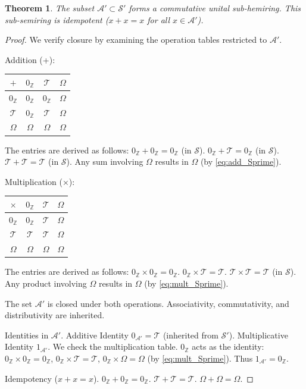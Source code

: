 \documentclass[11pt, a4paper]{article}
\theoremstyle{plain}
\newtheorem{theorem}{Theorem}[section]
\theoremstyle{definition}
\numberwithin{equation}{section}
\newcommand{\Z}{\mathbb{Z}}
\newcommand{\Tobj}{\mathcal{T}} %
\newcommand{\OmegaObj}{\Omega} %
\newcommand{\SemiringS}{\mathcal{S}}
\newcommand{\SemiringSPrime}{\mathcal{S}'}
\newcommand{\SetAPrime}{\mathcal{A}'}
\begin{document}
\begin{theorem}\label{thm:structure_Aprime}
The subset $\SetAPrime \subset \SemiringSPrime$ forms a commutative unital sub-hemiring. This sub-semiring is idempotent ($x+x=x$ for all $x \in \SetAPrime$).
\end{theorem}
\begin{proof}
We verify closure by examining the operation tables restricted to $\SetAPrime$.

Addition (+):
\begin{center}
\begin{tabular}{c|ccc}
$+$ & $0_{\Z}$ & $\Tobj$ & $\OmegaObj$ \\
\hline
$0_{\Z}$ & $0_{\Z}$ & $0_{\Z}$ & $\OmegaObj$ \\
$\Tobj$ & $0_{\Z}$ & $\Tobj$ & $\OmegaObj$ \\
$\OmegaObj$ & $\OmegaObj$ & $\OmegaObj$ & $\OmegaObj$
\end{tabular}
\end{center}
The entries are derived as follows:
$0_{\Z}+0_{\Z}=0_{\Z}$ (in $\SemiringS$). $0_{\Z}+\Tobj=0_{\Z}$ (in $\SemiringS$). $\Tobj+\Tobj=\Tobj$ (in $\SemiringS$).
Any sum involving $\OmegaObj$ results in $\OmegaObj$ (by \eqref{eq:add_Sprime}).

Multiplication ($\times$):
\begin{center}
\begin{tabular}{c|ccc}
$\times$ & $0_{\Z}$ & $\Tobj$ & $\OmegaObj$ \\
\hline
$0_{\Z}$ & $0_{\Z}$ & $\Tobj$ & $\OmegaObj$ \\
$\Tobj$ & $\Tobj$ & $\Tobj$ & $\OmegaObj$ \\
$\OmegaObj$ & $\OmegaObj$ & $\OmegaObj$ & $\OmegaObj$
\end{tabular}
\end{center}
The entries are derived as follows:
$0_{\Z}\times 0_{\Z}=0_{\Z}$. $0_{\Z}\times\Tobj=\Tobj$. $\Tobj\times\Tobj=\Tobj$ (in $\SemiringS$).
Any product involving $\OmegaObj$ results in $\OmegaObj$ (by \eqref{eq:mult_Sprime}).

The set $\SetAPrime$ is closed under both operations. Associativity, commutativity, and distributivity are inherited.

Identities in $\SetAPrime$.
Additive Identity $0_{\SetAPrime}=\Tobj$ (inherited from $\SemiringSPrime$).
Multiplicative Identity $1_{\SetAPrime}$. We check the multiplication table. $0_{\Z}$ acts as the identity: $0_{\Z}\times 0_{\Z}=0_{\Z}$, $0_{\Z}\times\Tobj=\Tobj$, $0_{\Z}\times\OmegaObj=\OmegaObj$ (by \eqref{eq:mult_Sprime}). Thus $1_{\SetAPrime}=0_{\Z}$.

Idempotency ($x+x=x$).
$0_{\Z}+0_{\Z}=0_{\Z}$. $\Tobj+\Tobj=\Tobj$. $\OmegaObj+\OmegaObj=\OmegaObj$.
\end{proof}
\end{document}
